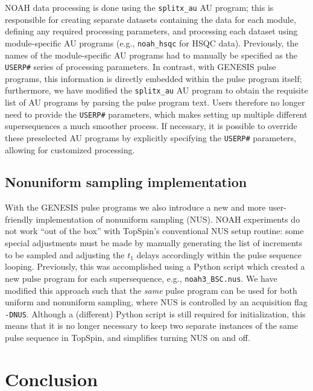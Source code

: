 \documentclass[a4paper,11pt]{article}
\newcommand{\carbon}{\ch{^{13}C}}
\begin{document}
\begin{refsection}
NOAH data processing is done using the \texttt{splitx\_au} AU program; this is responsible for creating separate datasets containing the data for each module, defining any required processing parameters, and processing each dataset using module-specific AU programs (e.g., \texttt{noah\_hsqc} for \carbon{} HSQC data).
Previously, the names of the module-specific AU programs had to manually be specified as the \texttt{USERP\#} series of processing parameters.
In contrast, with GENESIS pulse programs, this information is directly embedded within the pulse program itself; furthermore, we have modified the \texttt{splitx\_au} AU program to obtain the requisite list of AU programs by parsing the pulse program text.
Users therefore no longer need to provide the \texttt{USERP\#} parameters, which makes setting up multiple different supersequences a much smoother process.
If necessary, it is possible to override these preselected AU programs by explicitly specifying the \texttt{USERP\#} parameters, allowing for customized processing.

\subsection{Nonuniform sampling implementation}
\label{subsec:nus}

With the GENESIS pulse programs we also introduce a new and more user-friendly implementation of nonuniform sampling (NUS).
NOAH experiments do not work ``out of the box'' with TopSpin's conventional NUS setup routine: some special adjustments must be made by manually generating the list of increments to be sampled and adjusting the \(t_1\) delays accordingly within the pulse sequence looping.
Previously, this was accomplished using a Python script which created a new pulse program for each supersequence, e.g., \texttt{noah3\_BSC.nus}.\autocite{Claridge2019MRC}
We have modified this approach such that the \textit{same} pulse program can be used for both uniform and nonuniform sampling, where NUS is controlled by an acquisition flag \texttt{-DNUS}.
Although a (different) Python script is still required for initialization, this means that it is no longer necessary to keep two separate instances of the same pulse sequence in TopSpin, and simplifies turning NUS on and off.


\section{Conclusion}


\end{refsection}
\end{document}
